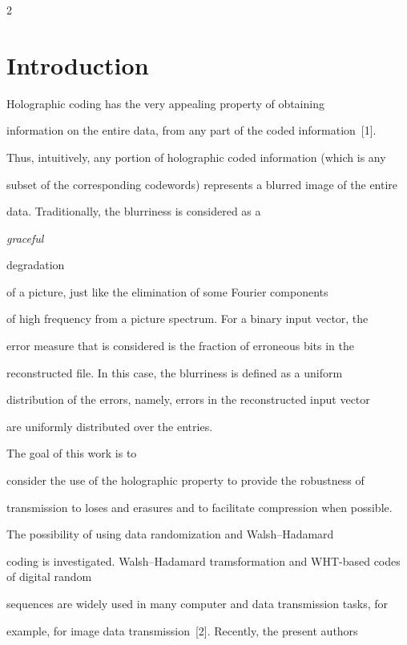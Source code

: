       \begin{multicols}{2}



            \label{st\stat}





\section{Introduction}



\noindent Holographic coding has the very appealing property of obtaining 

information on the entire data, from any part of the coded information~[1]. 

Thus, intuitively, any portion of holographic coded information (which is any 

subset of the corresponding codewords) represents a blurred image of the entire 

data. Traditionally, the  blurriness is considered as a {\it graceful 

degradation} of a picture, just like the elimination of some Fourier components 

of high frequency from a picture spectrum. For a binary input vector, the  

error measure that is considered is the fraction of erroneous bits in the 

reconstructed file. In this case,  the blurriness is defined as a uniform 

distribution of the errors, namely, errors in the reconstructed input vector 

are uniformly distributed over the entries. 



The  goal of this work is to 

consider the use of the holographic property to provide the robustness of 

transmission to loses and erasures and to facilitate compression when possible. 

The possibility of using data randomization and Walsh--Hadamard 

coding is investigated. Walsh--Hadamard tramsformation and WHT-based codes of digital random 

sequences are widely used in many computer and data transmission tasks, for 

example, for image data transmission~[2]. Recently, the present authors


\end{multicols}
